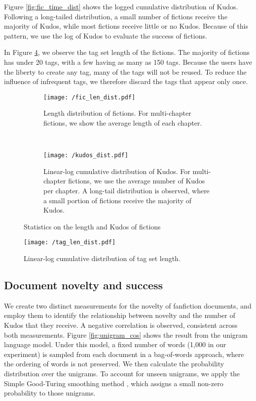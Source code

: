 \documentclass[a4paper]{article}
\begin{document}
Figure \ref{fig:fic_time_dist} shows the logged cumulative distribution of Kudos. Following a long-tailed distribution, a small number of fictions receive the majority of Kudos, while most fictions receive little or no Kudos. Because of this pattern, we use the log of Kudos to evaluate the success of fictions. 

In Figure \ref{fig:tag_set_len}, we observe the tag set length of the fictions. The majority of fictions has under 20 tags, with a few having as many as 150 tags. Because the users have the liberty to create any tag, many of the tags will not be reused. To reduce the influence of infrequent tags, we therefore discard the tags that appear only once.

\begin{figure}
    \centering
    \begin{subfigure}[b]{0.7\textwidth}
        \texttt{[image: /fic\_len\_dist.pdf]}
        \caption{Length distribution of fictions. For multi-chapter fictions, we show the average length of each chapter.}
        \label{fig:length_dist}
    \end{subfigure}
    ~ %
    \begin{subfigure}[b]{0.7\textwidth}
        \texttt{[image: /kudos\_dist.pdf]}
        \caption{Linear-log cumulative distribution of Kudos. For multi-chapter fictions, we use the average number of Kudos per chapter. A long-tail distribution is observed, where a small portion of fictions receive the majority of Kudos.}
        \label{fig:kudos_dist}
    \end{subfigure}
    \caption{Statistics on the length and Kudos of fictions}\label{fig:stats_len_kudos_tags}

\end{figure}

\begin{figure}
    \centering
        \texttt{[image: /tag\_len\_dist.pdf]}
        \caption{Linear-log cumulative distribution of tag set length. }
        \label{fig:tag_set_len}
\end{figure}

\subsection*{Document novelty and success}
We create two distinct measurements for the novelty of fanfiction documents, and employ them to identify the relationship between novelty and the number of Kudos that they receive. A negative correlation is observed, consistent across both measurements. Figure \ref{fig:unigram_cos} shows the result from the unigram language model. Under this model, a fixed number of words (1,000 in our experiment) is sampled from each document in a bag-of-words approach, where the ordering of words is not preserved. We then calculate the probability distribution over the unigrams. To account for unseen unigrams, we apply the Simple Good-Turing smoothing method \cite{gales1995good}, which assigns a small non-zero probability to those unigrams. 
\end{document}
